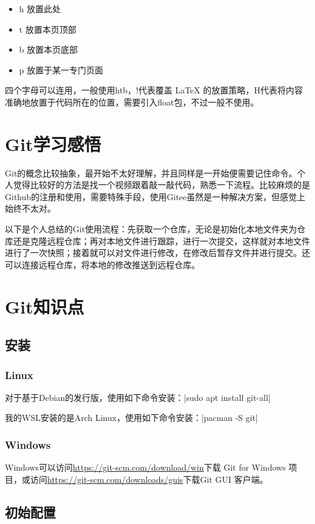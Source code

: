 \documentclass[fontset=ubuntu]{ctexart}
\begin{document}
\begin{itemize}
    \item h 放置此处
    \item t 放置本页顶部
    \item b 放置本页底部
    \item p 放置于某一专门页面
\end{itemize}

四个字母可以连用，一般使用htb，!代表覆盖 \LaTeX{} 的放置策略，H代表将内容准确地放置于代码所在的位置，需要引入float包，不过一般不使用。

\section{Git学习感悟}
Git的概念比较抽象，最开始不太好理解，并且同样是一开始便需要记住命令。个人觉得比较好的方法是找一个视频跟着敲一敲代码，熟悉一下流程。比较麻烦的是Github的注册和使用，需要特殊手段，使用Gitee虽然是一种解决方案，但感觉上始终不太对。

以下是个人总结的Git使用流程：先获取一个仓库，无论是初始化本地文件夹为仓库还是克隆远程仓库；再对本地文件进行跟踪，进行一次提交，这样就对本地文件进行了一次快照；接着就可以对文件进行修改，在修改后暂存文件并进行提交。还可以连接远程仓库，将本地的修改推送到远程仓库。

\section{Git知识点}

\subsection{安装}
\subsubsection{Linux}
对于基于Debian的发行版，使用如下命令安装：|sudo apt install git-all|

我的WSL安装的是Arch Linux，使用如下命令安装：|pacman -S git|

\subsubsection{Windows}
Windows可以访问\url{https://git-scm.com/download/win}下载 Git for Windows 项目，或访问\url{https://git-scm.com/downloads/guis}下载Git GUI 客户端。

\subsection{初始配置}
\end{document}
